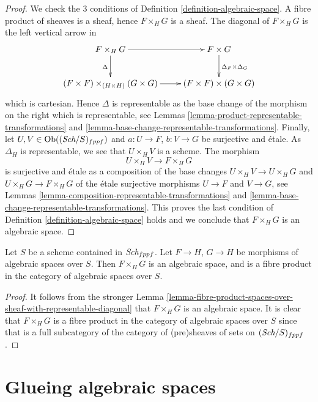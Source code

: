 \begin{proof}
We check the 3 conditions of
Definition \ref{definition-algebraic-space}.
A fibre product of sheaves is a sheaf, hence $F \times_H G$ is a sheaf.
The diagonal of $F \times_H G$ is the left vertical arrow in
$$
\xymatrix{
F \times_H G \ar[r] \ar[d]_\Delta &
F \times G \ar[d]^{\Delta_F \times \Delta_G} \\
(F \times F) \times_{(H \times H)} (G \times G) \ar[r] &
(F \times F) \times (G \times G)
}
$$
which is cartesian. Hence $\Delta$ is representable as the base change
of the morphism on the right which is representable, see
Lemmas \ref{lemma-product-representable-transformations} and
\ref{lemma-base-change-representable-transformations}.
Finally, let $U, V \in \mathop{\rm Ob}\nolimits((\textit{Sch}/S)_{fppf})$
and $a : U \to F$, $b : V \to G$ be surjective and \'etale.
As $\Delta_H$ is representable, we see that $U \times_H V$ is a scheme.
The morphism
$$
U \times_H V \longrightarrow F \times_H G
$$
is surjective and \'etale as a composition of the base changes
$U \times_H V \to U \times_H G$ and $U \times_H G \to F \times_H G$
of the \'etale surjective morphisms $U \to F$ and $V \to G$, see
Lemmas \ref{lemma-composition-representable-transformations} and
\ref{lemma-base-change-representable-transformations}.
This proves the last condition of
Definition \ref{definition-algebraic-space}
holds and we conclude that $F \times_H G$ is an algebraic space.
\end{proof}

\begin{lemma}
\label{lemma-fibre-product-spaces}
Let $S$ be a scheme contained in $\textit{Sch}_{fppf}$.
Let $F \to H$, $G \to H$ be morphisms of algebraic spaces over $S$.
Then $F \times_H G$ is an algebraic space, and is a fibre product
in the category of algebraic spaces over $S$.
\end{lemma}

\begin{proof}
It follows from the stronger
Lemma \ref{lemma-fibre-product-spaces-over-sheaf-with-representable-diagonal}
that $F \times_H G$ is an algebraic space.
It is clear that $F \times_H G$
is a fibre product in the category of algebraic spaces over $S$
since that is a full subcategory of the category
of (pre)sheaves of sets on $(\textit{Sch}/S)_{fppf}$.
\end{proof}






\section{Glueing algebraic spaces}
\label{section-glueing-algebraic-spaces}

